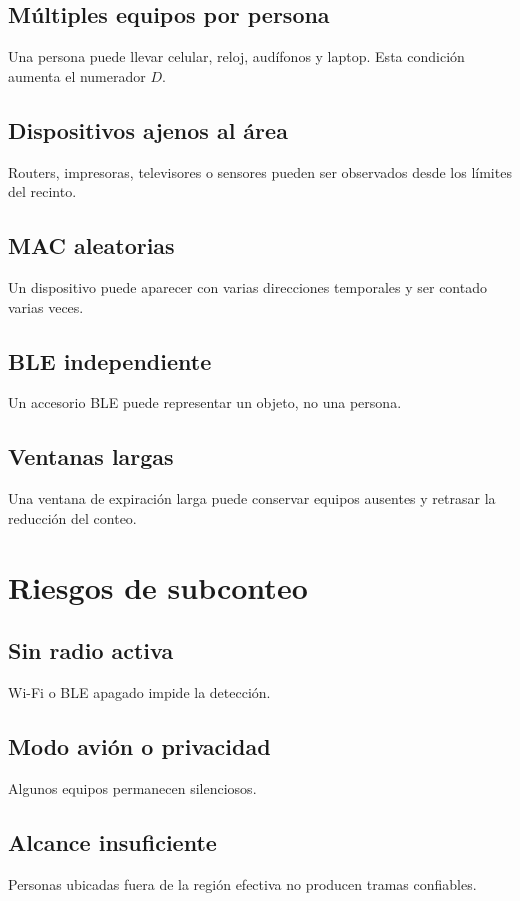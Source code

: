 \documentclass[12pt,a4paper]{article}
\begin{document}
\subsection{Múltiples equipos por persona}
Una persona puede llevar celular, reloj, audífonos y laptop. Esta condición aumenta el numerador $D$.

\subsection{Dispositivos ajenos al área}
Routers, impresoras, televisores o sensores pueden ser observados desde los límites del recinto.

\subsection{MAC aleatorias}
Un dispositivo puede aparecer con varias direcciones temporales y ser contado varias veces.

\subsection{BLE independiente}
Un accesorio BLE puede representar un objeto, no una persona.

\subsection{Ventanas largas}
Una ventana de expiración larga puede conservar equipos ausentes y retrasar la reducción del conteo.

\section{Riesgos de subconteo}
\subsection{Sin radio activa}
Wi-Fi o BLE apagado impide la detección.

\subsection{Modo avión o privacidad}
Algunos equipos permanecen silenciosos.

\subsection{Alcance insuficiente}
Personas ubicadas fuera de la región efectiva no producen tramas confiables.
\end{document}
